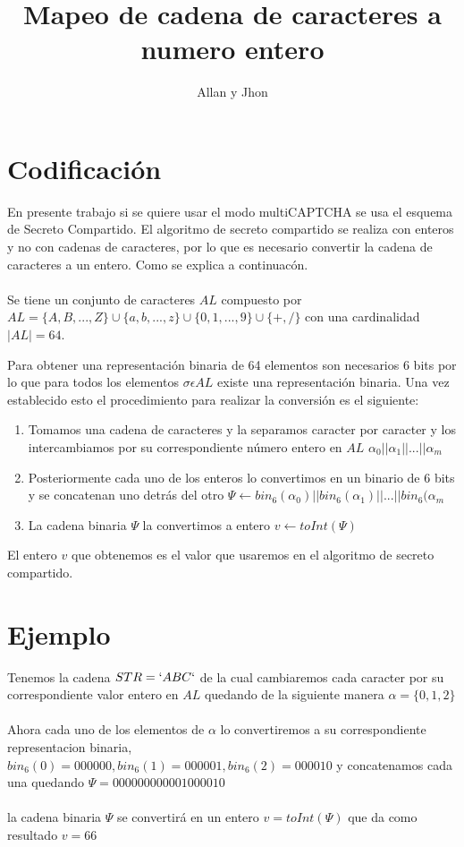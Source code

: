 \documentclass[a4paper,10pt]{article}
\title{Mapeo de cadena de caracteres a numero entero}
\author{Allan y Jhon}
\begin{document}
\maketitle

\section{Codificación}
En presente trabajo si se quiere usar el modo multiCAPTCHA se usa el esquema de Secreto Compartido.
El algoritmo de secreto compartido se realiza con enteros y no con cadenas de caracteres, por lo que es necesario convertir la cadena de caracteres a un entero.
Como se explica a continuacón.\\\\

Se tiene un conjunto de caracteres $AL$ compuesto por $AL=\{A,B,...,Z\}\cup\{a,b,...,z\}\cup\{0,1,...,9\}\cup\{+,/\}$ con una cardinalidad $|AL|=64$.

Para obtener una representación binaria de 64 elementos son necesarios 6 bits por lo que para todos los elementos $\sigma\epsilon AL$ existe una representación binaria. Una vez establecido esto el procedimiento para realizar la conversión es el siguiente:
\begin{enumerate}
 \item Tomamos una cadena de caracteres y la separamos caracter por caracter y los intercambiamos por su correspondiente número entero en $AL$ $\alpha _0||\alpha _1||...||\alpha _m$
 \item Posteriormente cada uno de los enteros lo convertimos en un binario de 6 bits y se concatenan uno detrás del otro $\Psi\longleftarrow bin_6(\alpha _0)||bin_6(\alpha _1)||...||bin_6(\alpha _m$
 \item La cadena binaria $\Psi$ la convertimos a entero $v\longleftarrow toInt(\Psi)$
\end{enumerate}
El entero $v$ que obtenemos es el valor que usaremos en el algoritmo de secreto compartido.
\\
\section{Ejemplo}
Tenemos la cadena $STR=`ABC`$ de la cual cambiaremos cada caracter por su correspondiente valor entero en $AL$ quedando de la siguiente manera $\alpha =\{0,1,2\}$
\\ 
\\
Ahora cada  uno de los elementos de $\alpha$ lo convertiremos a su correspondiente representacion binaria, $bin_6(0)=000000, bin_6(1)=000001, bin_6(2)=000010$ y concatenamos cada una quedando $\Psi = 000000000001000010$
\\
\\
la cadena binaria $\Psi$ se convertirá en un entero $v=toInt(\Psi )$ que da como resultado $v=66$
\end{document}
